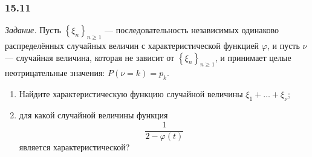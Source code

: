 \subsubsection*{15.11}

\textit{Задание.}
Пусть $ \left\{ \xi_n \right\}_{n \geq 1}$ ---
последовательность независимых одинаково распределённых случайных величин с характеристической
функцией $ \varphi $,
и пусть $ \nu $ --- случайная величина, которая не зависит от $ \left\{ \xi_n \right\}_{n \geq 1}$,
и принимает целые неотрицательные значения: $P \left( \nu = k \right) = p_k$.
\begin{enumerate}[label=\alph*)]
\item Найдите характеристическую функцию случайной величины $ \xi_1 + \dotsc + \xi_{ \nu }$;
\item для какой случайной величины функция
$$ \frac{1}{2 - \varphi \left( t \right) }$$
является характеристической?
\end{enumerate}

